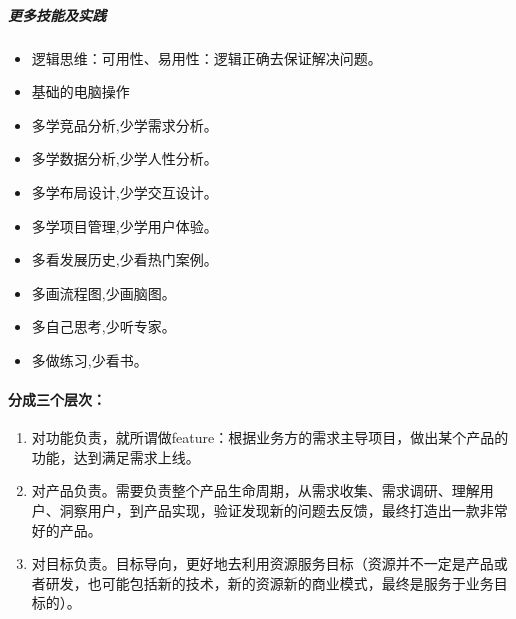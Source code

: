 \documentclass[letterpaper,10pt,english]{sphinxmanual}
\begin{document}
\subparagraph{更多技能及实践}
\label{\detokenize{chapter_introduction/PM:id50}}\begin{itemize}
\item {} 
逻辑思维：可用性、易用性：逻辑正确去保证解决问题。

\item {} 
基础的电脑操作

\item {} 
多学竞品分析,少学需求分析。

\item {} 
多学数据分析,少学人性分析。

\item {} 
多学布局设计,少学交互设计。

\item {} 
多学项目管理,少学用户体验。

\item {} 
多看发展历史,少看热门案例。

\item {} 
多画流程图,少画脑图。

\item {} 
多自己思考,少听专家。

\item {} 
多做练习,少看书。

\end{itemize}


\paragraph{分成三个层次：}
\label{\detokenize{chapter_introduction/PM:id51}}\begin{enumerate}
%
\item {} 
对功能负责，就所谓做feature：根据业务方的需求主导项目，做出某个产品的功能，达到满足需求上线。

\item {} 
对产品负责。需要负责整个产品生命周期，从需求收集、需求调研、理解用户、洞察用户，到产品实现，验证发现新的问题去反馈，最终打造出一款非常好的产品。

\item {} 
对目标负责。目标导向，更好地去利用资源服务目标（资源并不一定是产品或者研发，也可能包括新的技术，新的资源新的商业模式，最终是服务于业务目标的）。

\end{enumerate}
\end{document}

